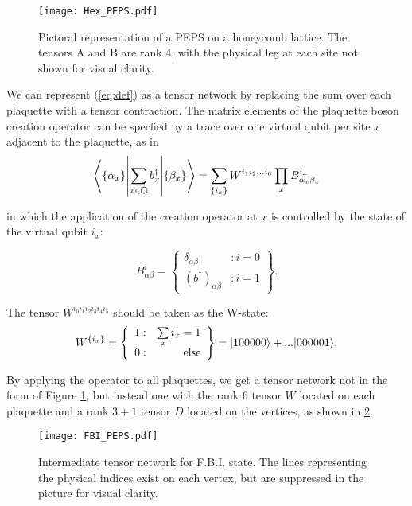 \begin{figure}[H]
	\centering
	\texttt{[image: Hex\_PEPS.pdf]}
	\caption{Pictoral representation of a PEPS on a honeycomb lattice. The tensors A and B are rank 4, with the physical leg at each site not shown for visual clarity.}
	\label{fig:PEPS}
\end{figure}

We can represent (\ref{eq:def}) as a tensor network by replacing the sum over each plaquette with a tensor contraction. The matrix elements of the plaquette boson creation operator can be specfied by a trace over one virtual qubit per site $x$ adjacent to the plaquette, as in 
\begin{equation}
\braopket{\{\alpha_x\}}{\sum\limits_{x \in \varhexagon} b^{\dagger}_{x}}{\{\beta_x\}} =
 \sum\limits_{\{i_x\}} W^{i_1 i_2 ... i_6} \prod\limits_x B^{i_x}_{\alpha_x \beta_x} 
\label{eq:plaquette}
\end{equation}

in which the application of the creation operator at $x$ is controlled by the state of the virtual qubit $i_x$:

$$
B^i_{\alpha \beta} = \left\{
     \begin{array}{lr}
       \delta_{\alpha \beta} & : i = 0\\
       (b^{\dagger})_{\alpha \beta} & : i = 1
     \end{array}
   \right\}.
$$

The tensor $W^{i_0 i_1 i_2 i_3 i_4 i_5}$ should be taken as the W-state: 
$$ W^{\{i_x\}}  = \left\{ \begin{array}{lr}
													1  : & \sum\limits_x i_x = 1 \\
													0  : & \text{else}
													\end{array}
											\right\} = \vert 100000 \rangle + ...\vert 000001 \rangle.
$$

By applying the operator to all plaquettes, we get a tensor network not in the form of Figure \ref{fig:PEPS}, but instead one with the rank 6 tensor $W$ located on each plaquette and a rank $3+1$ tensor $D$ located on the vertices, as shown in \ref{fig:FBI_PEPS}. 

\begin{figure}[H]
	\centering
	\texttt{[image: FBI\_PEPS.pdf]}
	\caption{Intermediate tensor network for F.B.I. state. The lines representing the physical indices exist on each vertex, but are suppressed in the picture for visual clarity.}
	\label{fig:FBI_PEPS}
\end{figure}


